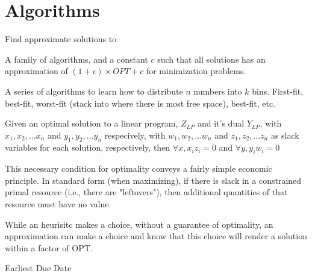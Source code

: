 \section{Algorithms}\label{section:word}

\begin{definition}
    Find approximate solutions to~
\end{definition}

\begin{definition}
\label{APTAS}
    A family of algorithms, and a constant $c$ such that all solutions has an
    approximation of $(1 + \epsilon)\times{OPT} + c$ for minimization problems.
\end{definition}


\begin{definition}
    A series of algorithms to learn how to distribute $n$ numbers into $k$ bins.
    First-fit, best-fit, worst-fit (stack into where there is most free space),
    best-fit, etc.
\end{definition}

\begin{definition}
    Given an optimal solution to a linear program,
    $Z_{LP}$ and it's dual $Y_{LP}$, with $x_{1}, x_{2}, \dots x_{n}$ and
    $y_{1}, y_{2}, \dots y_{n}$ respecively, with
    $w_{1}, w_{2}, \dots w_{n}$ and $z_{1}, z_{2}, \dots z_{n}$  as slack
    variables for each solution, respectively,
    then $\forall x, x_{i}z_{i} = 0$ and $\forall y, y_{i} w_{i} = 0$

    This necessary condition for optimality conveys a fairly simple economic
    principle.  In standard form (when maximizing), if there is slack in a
    constrained primal resource (i.e., there are "leftovers"),
    then additional quantities of that resource must have no value. 
\end{definition}

\begin{definition}
    While an heurisitc makes a choice, without a guarantee of optimality,
    an approximation can make a choice and know that this choice will render
    a solution within a factor of OPT.
\end{definition}

\begin{definition}[EDD]\label{EDD}
    Earliest Due Date
\end{definition}

